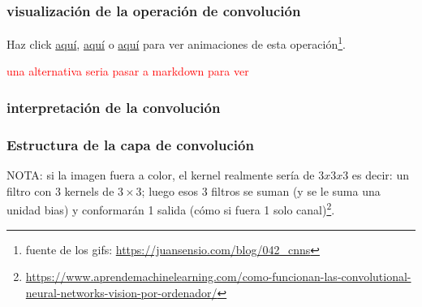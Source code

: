 \documentclass{article}
\begin{document}
\subsubsection{visualización de la operación de convolución}

Haz click \href{https://miro.medium.com/max/1052/1*GcI7G-JLAQiEoCON7xFbhg.gif}{aquí}, \href{https://cdn-media-1.freecodecamp.org/images/gb08-2i83P5wPzs3SL-vosNb6Iur5kb5ZH43}{aquí} o \href{https://thumbs.gfycat.com/AffectionateMemorableGreyhounddog-size_restricted.gif}{aquí} para ver animaciones de esta operación\footnote{fuente de los gifs: \url{https://juansensio.com/blog/042_cnns}}.

\textcolor{red}{una alternativa seria pasar a markdown para ver }\\





\subsubsection{interpretación de la convolución}


\subsubsection{Estructura de la capa de convolución}

NOTA: si la imagen fuera a color, el kernel realmente sería de $3x3x3$ es decir: un filtro con 3 kernels de $3\times3$; luego  esos 3 filtros se suman (y se le suma una unidad bias) y conformarán 1 salida (cómo si fuera 1 solo canal)\footnote{\url{https://www.aprendemachinelearning.com/como-funcionan-las-convolutional-neural-networks-vision-por-ordenador/}}.\\
\end{document}

